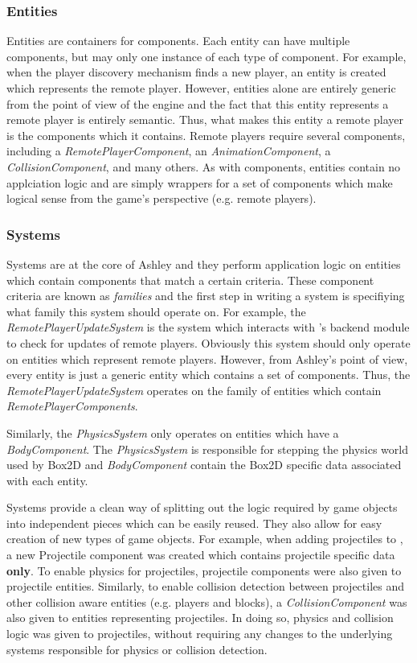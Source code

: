 \subsubsection{Entities}
Entities are containers for components. Each entity can have multiple components, but may only one instance of each type of component. For example, when the player discovery mechanism finds a new player, an entity is created which represents the remote player. However, entities alone are entirely generic from the point of view of the engine and the fact that this entity represents a remote player is entirely semantic. Thus, what makes this entity a remote player is the components which it contains. Remote players require several components, including a \textit{RemotePlayerComponent}, an \textit{AnimationComponent}, a \textit{CollisionComponent}, and many others. As with components, entities contain no applciation logic and are simply wrappers for a set of components which make logical sense from the game's perspective (e.g. remote players).

\subsubsection{Systems}
Systems are at the core of Ashley and they perform application logic on entities which contain components that match a certain criteria. These component criteria are known as \textit{families} and the first step in writing a system is specifiying what family this system should operate on. For example, the \textit{RemotePlayerUpdateSystem} is the system which interacts with \game{}'s backend module to check for updates of remote players. Obviously this system should only operate on entities which represent remote players. However, from Ashley's point of view, every entity is just a generic entity which contains a set of components. Thus, the \textit{RemotePlayerUpdateSystem} operates on the family of entities which contain \textit{RemotePlayerComponents}. 

Similarly, the \textit{PhysicsSystem} only operates on entities which have a \textit{BodyComponent}. The \textit{PhysicsSystem} is responsible for stepping the physics world used by Box2D and \textit{BodyComponent} contain the Box2D specific data associated with each entity.

Systems provide a clean way of splitting out the logic required by game objects into independent pieces which can be easily reused. They also allow for easy creation of new types of game objects. For example, when adding projectiles to \game{}, a new Projectile component was created which contains projectile specific data \textbf{only}. To enable physics for projectiles, projectile components were also given to projectile entities. Similarly, to enable collision detection between projectiles and other collision aware entities (e.g. players and blocks), a \textit{CollisionComponent} was also given to entities representing projectiles. In doing so, physics and collision logic was given to projectiles, without requiring any changes to the underlying systems responsible for physics or collision detection.

